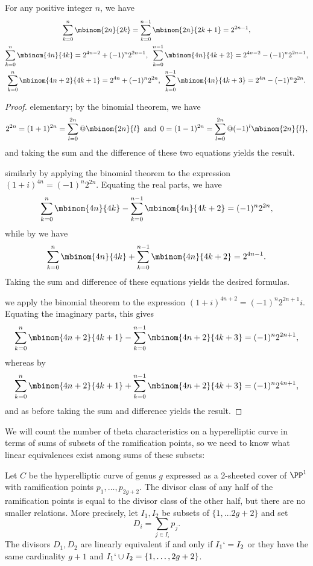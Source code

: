 \begin{lemma}
\label{summing binomials}
For any positive integer $n$,
we have
\let\binom\mbinom
\begin{gather}
\let\;\relax
\sum_{k=0}^n \binom{2n}{2k} \; = \; \sum_{k=0}^{n-1} \binom{2n}{2k+1}
\; = \; 2^{2n-1}
,\\
\sum_{k=0}^n \binom{4n}{4k} = 2^{4n-2}  + (-1)^n 2^{2n-1},
\quad \sum_{k=0}^{n-1} \binom{4n}{4k+2} = 2^{4n-2} - (-1)^n  2^{2n-1}
,\\
\sum_{k=0}^n \binom{4n+2}{4k+1} = 2^{4n} + (-1)^n 2^{2n},
\quad \sum_{k=0}^{n-1} \binom{4n}{4k+3} = 2^{4n} - (-1)^n  2^{2n}
.
\end{gather}
\end{lemma}

\begin{proof}
\let\binom\mbinom
{}
elementary; by the binomial theorem, we have
$$
2^{2n} = (1+1)^{2n} = \sum_{l = 0}^{2n}@\binom{2n}{l} \quad \text{and}
\quad 0 = (1-1)^{2n} = \sum_{l = 0}^{2n}@(-1)^l\binom{2n}{l}
,
$$
and taking the sum and the difference of these two equations yields the
result.

similarly by applying the binomial theorem to the
expression $(1 + i)^{4n} = (-1)^n2^{2n}$. Equating the real parts, we have
$$
\sum_{k=0}^n \binom{4n}{4k} - \sum_{k=0}^{n-1} \binom{4n}{4k+2} =
(-1)^n2^{2n}
,
$$
while by
we have
$$
\sum_{k=0}^n \binom{4n}{4k} + \sum_{k=0}^{n-1} \binom{4n}{4k+2} =
2^{4n-1}.
$$
Taking the sum and difference of these equations yields the desired
formulas.

we apply the binomial theorem to the expression $(1 + i)^{4n+2} =
 (-1)^n2^{2n+1}i$. Equating the imaginary parts, this gives
\let\;\relax
$$
\sum_{k=0}^n \binom{4n+2}{4k+1} - \sum_{k=0}^{n-1} \binom{4n+2}{4k+3}
\; = \; (-1)^n2^{2n+1}
,
$$
whereas by
$$
\sum_{k=0}^n \binom{4n+2}{4k+1} + \sum_{k=0}^{n-1} \binom{4n+2}{4k+3}
\; = \; (-1)^n 2^{4n+1}
,
$$
and as before taking the sum and difference
yields the
result.
\end{proof}

We will count the number of theta characteristics on a hyperelliptic
curve in terms of sums of subsets of the ramification points, so we need
to know what linear equivalences exist among sums of these subsets:

\begin{lemma}
\label{ramification point relations}
Let $C$ be the hyperelliptic curve of genus $g$ expressed as a 2-sheeted
cover of $\PP^1$ with ramification points $p_1,\dots,p_{2g+2}$. The
divisor class of
 any half of the ramification points is equal to the divisor class of
 the other half, but there are no
 smaller relations. More precisely,
 let $I_1,I_2$ be subsets of $\{1,\dots 2g+2\}$
and set
$$
D_i = \sum_{j\in I_i} p_j.
$$
The divisors $D_1,D_2$ are linearly equivalent if and only if $I_1 `= I_2$
or they
have the same cardinality $g+1$ and $I_1`\cup I_2 = \{1,\dots, 2g+2\}$.
\end{lemma}

